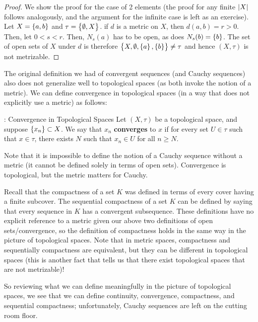\begin{proof}
    We show the proof for the case of 2 elements (the proof for any finite $\abs{X}$ follows analogously, and the argument for the infinite case is left as an exercise). Let $X = \set{a, b}$ and $\tau = \set{\emptyset, X}$. if $d$ is a metric on $X$, then $d(a, b) = r > 0$. Then, let $0 < s < r$. Then, $N_{s}(a)$ has to be open, as does $N_{s}(b) = \set{b}$. The set of open sets of $X$ under $d$ is therefore $\set{X, \emptyset, \set{a}, \set{b}} \neq \tau$ and hence $(X, \tau)$ is not metrizable.
\end{proof}

The original definition we had of convergent sequences (and Cauchy sequences) also does not generalize well to topological spaces (as both invoke the notion of a metric). We can define convergence in topological spaces (in a way that does not explicitly use a metric) as follows:

\begin{ndef}{: Convergence in Topological Spaces}{}
    Let $(X, \tau)$ be a topological space, and suppose $\set{x_n} \subset X$. We say that $x_n$ \textbf{converges} to $x$ if for every set $U \in \tau$ such that $x \in \tau$, there exists $N$ such that $x_n \in U$ for all $n \geq N$. 
\end{ndef}

Note that it is impossible to define the notion of a Cauchy sequence without a metric (it cannot be defined solely in terms of open sets). Convergence is topological, but the metric matters for Cauchy.

Recall that the compactness of a set $K$ was defined in terms of every cover having a finite subcover. The sequential compactness of a set $K$ can be defined by saying that every sequence in $K$ has a convergent subsequence. These definitions have no explicit reference to a metric given our above two definitions of open sets/convergence, so the definition of compactness holds in the same way in the picture of topological spaces. Note that in metric spaces, compactness and sequentially compactness are equivalent, but they can be different in topological spaces (this is another fact that tells us that there exist topological spaces that are not metrizable)!

So reviewing what we can define meaningfully in the picture of topological spaces, we see that we can define continuity, convergence, compactness, and sequential compactness; unfortunately, Cauchy sequences are left on the cutting room floor.